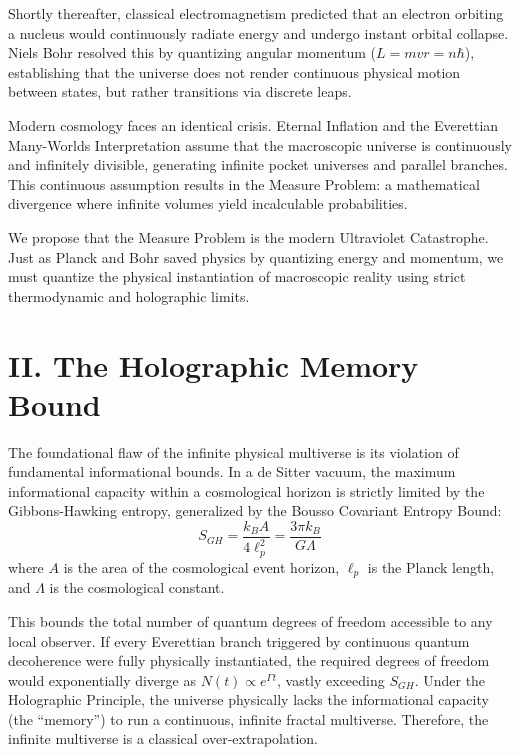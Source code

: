\documentclass[aps,prd,reprint,superscriptaddress,nofootinbib]{revtex4-2}
\begin{document}
Shortly thereafter, classical electromagnetism predicted that an electron orbiting a nucleus would continuously radiate energy and undergo instant orbital collapse. Niels Bohr resolved this by quantizing angular momentum ($L = mvr = n\hbar$), establishing that the universe does not render continuous physical motion between states, but rather transitions via discrete leaps.

Modern cosmology faces an identical crisis. Eternal Inflation and the Everettian Many-Worlds Interpretation assume that the macroscopic universe is continuously and infinitely divisible, generating infinite pocket universes and parallel branches. This continuous assumption results in the Measure Problem: a mathematical divergence where infinite volumes yield incalculable probabilities. 

We propose that the Measure Problem is the modern Ultraviolet Catastrophe. Just as Planck and Bohr saved physics by quantizing energy and momentum, we must quantize the physical instantiation of macroscopic reality using strict thermodynamic and holographic limits.

\section{II. The Holographic Memory Bound}

The foundational flaw of the infinite physical multiverse is its violation of fundamental informational bounds. In a de Sitter vacuum, the maximum informational capacity within a cosmological horizon is strictly limited by the Gibbons-Hawking entropy, generalized by the Bousso Covariant Entropy Bound:
\begin{equation}
S_{GH} = \frac{k_B A}{4 \ell_p^2} = \frac{3\pi k_B}{G \Lambda}
\end{equation}
where $A$ is the area of the cosmological event horizon, $\ell_p$ is the Planck length, and $\Lambda$ is the cosmological constant. 

This bounds the total number of quantum degrees of freedom accessible to any local observer. If every Everettian branch triggered by continuous quantum decoherence were fully physically instantiated, the required degrees of freedom would exponentially diverge as $N(t) \propto e^{\Gamma t}$, vastly exceeding $S_{GH}$. Under the Holographic Principle, the universe physically lacks the informational capacity (the ``memory'') to run a continuous, infinite fractal multiverse. Therefore, the infinite multiverse is a classical over-extrapolation.
\end{document}
